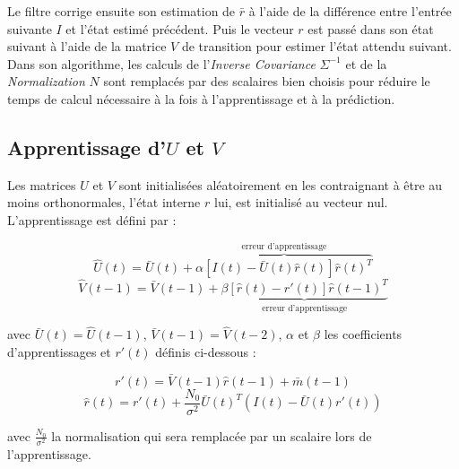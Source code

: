 Le filtre corrige ensuite son estimation de $\bar{r}$ à l'aide de la
différence entre l'entrée suivante $I$ et l'état estimé précédent. Puis le
vecteur $r$ est passé dans son état suivant à l'aide de la matrice $V$ de
transition pour estimer l'état attendu suivant.\\

Dans son algorithme, les calculs de l'\textit{Inverse Covariance} $\Sigma^{-1}$
et de la \textit{Normalization} $N$ sont remplacés par des scalaires bien
choisis %
pour réduire le temps de calcul nécessaire à la fois à
l'apprentissage et à la prédiction.


\subsection{Apprentissage d'$U$ et $V$} %
\label{sub:Apprentissage de U et V}

Les matrices $U$ et $V$ sont initialisées aléatoirement en les contraignant
à être au moins orthonormales, l'état interne $r$ lui, est initialisé au vecteur
nul. L'apprentissage est défini par :

\begin{equation}
   \label{eqn:learning_U}
   \hat{U}(t) = \bar{U}(t) + \overbrace{\alpha[I(t) - \bar{U}(t)\hat{r}(t)]\hat{r}(t)^T}^\text{erreur d'apprentissage}
\end{equation}
\begin{equation}
   \label{eqn:learning_V}
   \hat{V}(t-1) = \bar{V}(t-1) + \underbrace{\beta[\hat{r}(t) - r'(t)]\hat{r}(t-1)^T}_\text{erreur d'apprentissage}
\end{equation}

avec $\bar{U}(t) = \hat{U}(t-1)$, $\bar{V}(t-1) = \hat{V}(t-2)$, $\alpha$ et
$\beta$ les coefficients d'apprentissages et $r'(t)$ définis ci-dessous :

\begin{equation}
   \label{eqn:def_r_prime}
   r'(t) =  \bar{V}(t-1)\hat{r}(t-1) + \bar{m}(t-1)
\end{equation}
\begin{equation}
   \label{eqn:def_r_hat}
   \hat{r}(t) = r'(t) + \frac{N_0}{\sigma^2}\bar{U}(t)^T(I(t)-\bar{U}(t)r'(t))
\end{equation}

avec $\frac{N_0}{\sigma^2}$ la normalisation qui sera remplacée par un scalaire lors
de l'apprentissage.

